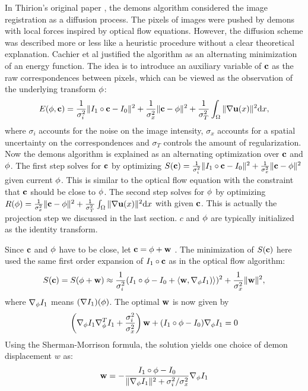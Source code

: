 \documentclass[letterpaper,12pt]{article}
\begin{document}
In Thirion's original paper \cite{Thirion98}, the demons algorithm considered the image registration as a diffusion process. The pixels of images were pushed by demons with local forces inspired by optical flow equations. However, the diffusion scheme was described more or less like a heuristic procedure without a clear theoretical explanation. Cachier et al \cite{Cachier2003} justified the algorithm as an alternating minimization of an energy function. The idea is to introduce an auxiliary variable of $\mathbf{c}$ as the raw correspondences between pixels, which can be viewed as the observation of the underlying transform $\phi$:
\begin{align}
E(\phi,\mathbf{c})= \frac{1}{\sigma_i^2}\| I_1 \circ \mathbf{c} - I_0 \|^2
+\frac{1}{\sigma_x^2} \|\mathbf{c} - \phi\|^2
+\frac{1}{\sigma_T^2} \int_\Omega \| \nabla\mathbf{u}(x)\|^2 \text{d} x,
\end{align}
where $\sigma_i$ accounts for the noise on the image intensity, $\sigma_x$ accounts for a spatial uncertainty on the correspondences and $\sigma_T$ controls the amount of regularization. Now the demons algorithm is explained as an alternating optimization over $\mathbf{c}$ and $\phi$. The first step solves for $\mathbf{c}$ by optimizing $S(\mathbf{c}) = \frac{1}{\sigma_i^2}\| I_1 \circ \mathbf{c} - I_0 \|^2 +\frac{1}{\sigma_x^2} \|\mathbf{c} - \phi\|^2 $ given current $\phi$. 
This is similar to the optical flow equation with the constraint that $\mathbf{c}$ should be close to $\phi$. 
The second step solves for $\phi$ by optimizing $R(\phi) = \frac{1}{\sigma_x^2} \|\mathbf{c} - \phi\|^2+\frac{1}{\sigma_T^2} \int_\Omega \| \nabla\mathbf{u}(x)\|^2 \text{d} x$ with given $\mathbf{c}$. 
This is actually the projection step we discussed in the last
section. $c$ and $\phi$ are typically initialized as the identity transform.

Since $\mathbf{c}$ and $\phi$ have to be close, let $\mathbf{c} = \phi + \mathbf{w}$ . The minimization of $S(\mathbf{c})$ here used the same first order expansion of $I_1 \circ \mathbf{c} $ as in the optical flow algorithm:
\begin{align}
S(\mathbf{c}) = S(\phi+\mathbf{w}) \approx
\frac{1}{\sigma_i^2} ( I_1 \circ \phi - I_0 + \langle \mathbf{w}, \nabla_{\phi} I_1 ) \rangle )^2 
+ \frac{1}{\sigma_x^2} \| \mathbf{w} \|^2,
\end{align}
where $\nabla_{\phi}I_1$ means $(\nabla I_1)(\phi)$. The optimal $\mathbf{w}$ is now given by 
\begin{align}
\left( \nabla_{\phi}I_1 \nabla_{\phi}^T I_1 
      + \frac{\sigma_i^2}{\sigma_x^2}  
\right) \mathbf{w} 
+ (I_1 \circ \phi - I_0 )\nabla_{\phi}I_1 = 0
\end{align}
Using the Sherman-Morrison formula, the solution yields one choice of demon displacement $w$ as:
\begin{align}
\mathbf{w} = -\frac{I_1 \circ \phi - I_0 }
           {\|\nabla_{\phi}I_1\|^2 + {\sigma_i^2}/{\sigma_x^2}}
           \nabla_{\phi}I_1
\label{eq:adddemonforce}           
\end{align}
\end{document}
